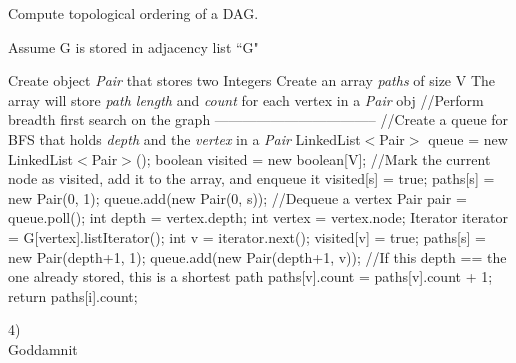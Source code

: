 \documentclass[12pt]{article}
\begin{document}
\begin{algorithm}[H]
\caption{Compute topological ordering of a DAG.}
\begin{algorithmic}
\STATE Assume G is stored in adjacency list ``G"

\STATE 
\STATE Create object \textit{Pair} that stores two Integers
\STATE Create an array \textit{paths} of size V
\STATE The array will store \textit{path length} and \textit{count} for each vertex in a \textit{Pair} obj
\STATE
\STATE //Perform breadth first search on the graph -----------------------------------
\STATE
\STATE //Create a queue for BFS that holds \textit{depth} and the \textit{vertex} in a \textit{Pair}
\STATE LinkedList$<$Pair$>$ queue = new LinkedList$<$Pair$>$();
\STATE boolean visited = new boolean[V];
\STATE
\STATE //Mark the current node as visited, add it to the array, and enqueue it 
\STATE visited[s] = true; 
\STATE paths[s] = new Pair(0, 1);
\STATE queue.add(new Pair(0, s)); 
\STATE
{}
\STATE //Dequeue a vertex
\STATE Pair pair = queue.poll(); 
\STATE int depth = vertex.depth;
\STATE int vertex = vertex.node;
\STATE
\STATE Iterator iterator = G[vertex].listIterator();
\STATE int v = iterator.next(); 
\STATE
{}
\STATE visited[v] = true; 
\STATE paths[s] = new Pair(depth+1, 1);
\STATE queue.add(new Pair(depth+1, v));
\STATE
{}
\STATE //If this depth == the one already stored, this is a shortest path
\STATE paths[v].count = paths[v].count + 1;
\ENDIF
\ENDWHILE
\ENDWHILE
\STATE return paths[i].count;

\end{algorithmic}
\end{algorithm}

\pagebreak

4) \\
Goddamnit


\end{document}
